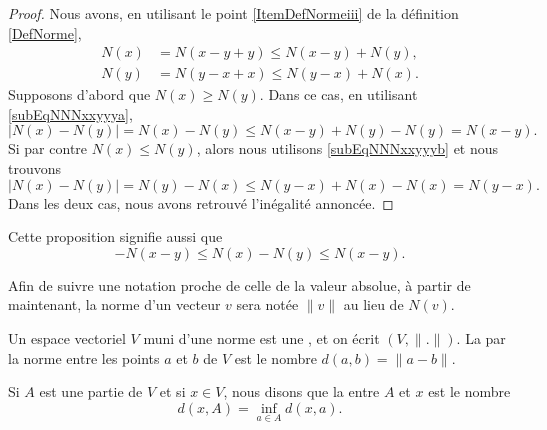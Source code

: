 \begin{proof}
	Nous avons, en utilisant le point \ref{ItemDefNormeiii} de la définition \ref{DefNorme},
	\begin{subequations}
		\begin{align}
			N(x)&=N(x-y+y)\leq N(x-y)+N(y),	\label{subEqNNNxxyyya}\\
			N(y)&=N(y-x+x)\leq N(y-x)+N(x).	\label{subEqNNNxxyyyb}
		\end{align}
	\end{subequations}
	Supposons d'abord que $N(x)\geq N(y)$. Dans ce cas, en utilisant \eqref{subEqNNNxxyyya},
	\begin{equation}
		\big| N(x)-N(y) \big|=N(x)-N(y)\leq N(x-y)+N(y)-N(y)=N(x-y).
	\end{equation}
	Si par contre $N(x)\leq N(y)$, alors nous utilisons \eqref{subEqNNNxxyyyb} et nous trouvons
	\begin{equation}
		\big| N(x)-N(y) \big|=N(y)-N(x)\leq N(y-x)+N(x)-N(x)=N(y-x).
	\end{equation}
	Dans les deux cas, nous avons retrouvé l'inégalité annoncée.
\end{proof}
Cette proposition signifie aussi que
\begin{equation}	\label{EqNleqNNleqNvqlqbs}
	-N(x-y)\leq N(x)-N(y)\leq N(x-y).
\end{equation}

Afin de suivre une notation proche de celle de la valeur absolue, à partir de maintenant, la norme d'un vecteur $v$ sera notée $\| v\|$ au lieu de $N(v)$.
\begin{definition}		\label{DefEVNetDistance}
	Un espace vectoriel $V$ muni d'une norme est une , et on écrit $(V,\| . \|)$. La  par la norme entre les points $a$ et $b$ de $V$ est le nombre $d(a,b)=\| a-b \|$.

	Si $A$ est une partie de $V$ et si $x\in V$, nous disons que la  entre $A$ et $x$ est le nombre
	\begin{equation}		\label{EqdefDistaA}
		d(x,A)=\inf_{a\in A}d(x,a).
	\end{equation}
\end{definition}
\newcommand{\CaptionFigDistanceEnsemble}{La distance entre $x$ et $A$ est donnée par la distance entre $x$ et $p$. Les distances entre $x$ et les autres points de $A$ sont plus grandes que $d(x,p)$.}


